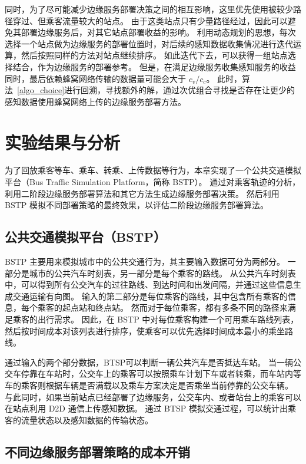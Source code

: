 同时，为了尽可能减少边缘服务部署决策之间的相互影响，这里优先使用被较少路径穿过、但乘客流量较大的站点。
由于这类站点只有少量路径经过，因此可以避免其部署边缘服务后，对其它站点部署收益的影响。
利用动态规划的思想，每次选择一个站点做为边缘服务的部署位置时，对后续的感知数据收集情况进行迭代运算，然后按照同样的方法对站点继续排序。
如此迭代下去，可以获得一组站点选择结合，作为边缘服务的部署参考。
但是，在满足边缘服务收集感知服务的收益同时，最后依赖蜂窝网络传输的数据量可能会大于 $c_v / c_c$。
此时，算法~\ref{algo_choice}进行回溯，寻找额外的解，通过次优组合寻找是否存在让更少的感知数据使用蜂窝网络上传的边缘服务部署方法。

\section{实验结果与分析}

为了回放乘客等车、乘车、转乘、上传数据等行为，本章实现了一个公共交通模拟平台（Bus Traffic Simulation Platform，简称 BSTP）。
通过对乘客轨迹的分析，利用二阶段边缘服务部署算法和其它方法生成边缘服务部署决策。
然后利用 BSTP 模拟不同部署策略的最终效果，以评估二阶段边缘服务部署算法。

\subsection{公共交通模拟平台（BSTP）}

BSTP 主要用来模拟城市中的公共交通行为，其主要输入数据可分为两部分。
一部分是城市的公共汽车时刻表，另一部分是每个乘客的路线。
从公共汽车时刻表中，可以得到所有公交汽车的过往路线、到达时间和出发间隔，并通过这些信息生成交通运输有向图。
输入的第二部分是每位乘客的路线，其中包含所有乘客的信息，每个乘客的起点站和终点站。
然而对于每位乘客，都有多条不同的路径来满足乘客的出行需求。
因此，在 BSTP 中对每位乘客构建一个可用乘车路线列表，然后按时间成本对该列表进行排序，使乘客可以优先选择时间成本最小的乘坐路线。

通过输入的两个部分数据，BTSP可以判断一辆公共汽车是否抵达车站。
当一辆公交车停靠在车站时，公交车上的乘客可以按照乘车计划下车或者转乘，而车站内等车的乘客则根据车辆是否满载以及乘车方案决定是否乘坐当前停靠的公交车辆。
与此同时，如果当前站点已经部署了边缘服务，公交车内、或者站台上的乘客可以在站点利用 D2D 通信上传感知数据。
通过 BTSP 模拟交通过程，可以统计出乘客的流量状态以及感知数据的传输状态。

\subsection{不同边缘服务部署策略的成本开销}


